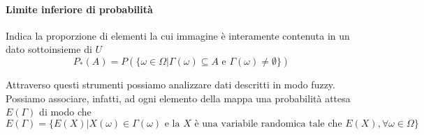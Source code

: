 \paragraph{Limite inferiore di probabilità}
Indica la proporzione di elementi la cui immagine è interamente contenuta in un dato sottoinsieme di $U$
$$P_*(A) = P(\{ \omega \in \Omega | \Gamma (\omega) \subseteq A \text{ e } \Gamma(\omega) \neq \emptyset \})$$

Attraverso questi strumenti possiamo analizzare dati descritti in modo fuzzy. Possiamo associare, infatti, ad ogni elemento della mappa una probabilità attesa $E(\Gamma)$ di modo che
$$E(\Gamma) = \{ E(X) | X(\omega) \in \Gamma(\omega) \text{ e la } X \text{ è una variabile randomica tale che } E(X), \forall \omega \in \Omega \}$$

\newpage